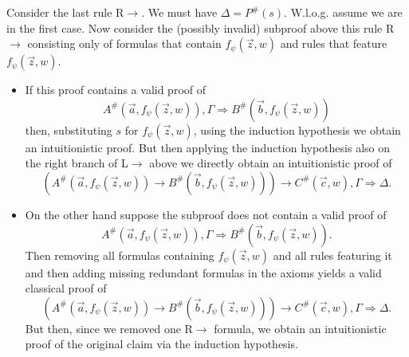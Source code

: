\documentclass[a4paper,11pt]{report}
\theoremstyle{definition}
\theoremstyle{definition}
\theoremstyle{definition}
\theoremstyle{definition}
\theoremstyle{definition}
\theoremstyle{definition}
\theoremstyle{definition}
\begin{document}
	Consider the last rule R$\to$. We must have $\Delta = P^\#(s)$.  W.l.o.g. assume we are in the first case.  Now consider the (possibly invalid) subproof above this rule R$\to$ consisting only of formulas that contain $f_\psi(\vec z, w)$ and rules that feature $f_\psi(\vec z, w)$.
	\begin{itemize}
		\item If this proof contains a valid proof of $$A^\#(\vec a, f_\psi(\vec z, w)),\Gamma\Rightarrow B^\#(\vec b, f_\psi(\vec z, w))$$ then, substituting $s$ for $f_\psi(\vec z, w)$, using the induction hypothesis we obtain an intuitionistic proof. But then applying the induction hypothesis also on the right branch of L$\to$ above we directly obtain an intuitionistic proof of $$(A^\#(\vec a, f_\psi(\vec z, w))\to B^\#(\vec b, f_\psi(\vec z, w)))\to C^\#(\vec c, w), \Gamma\Rightarrow \Delta.$$
		\item  On the other hand suppose the subproof does not contain a valid proof of 
		$$A^\#(\vec a, f_\psi(\vec z, w)),\Gamma\Rightarrow B^\#(\vec b, f_\psi(\vec z, w)).$$Then removing all formulas containing $f_\psi(\vec z, w)$ and all rules featuring it and then adding missing redundant formulas in the axioms yields a valid classical proof of $$(A^\#(\vec a, f_\psi(\vec z, w))\to B^\#(\vec b, f_\psi(\vec z, w)))\to C^\#(\vec c, w), \Gamma\Rightarrow \Delta.$$ But then, since we removed one R$\to$ formula, we obtain an intuitionistic proof of the original claim via the induction hypothesis.
	\end{itemize}
\end{document}
